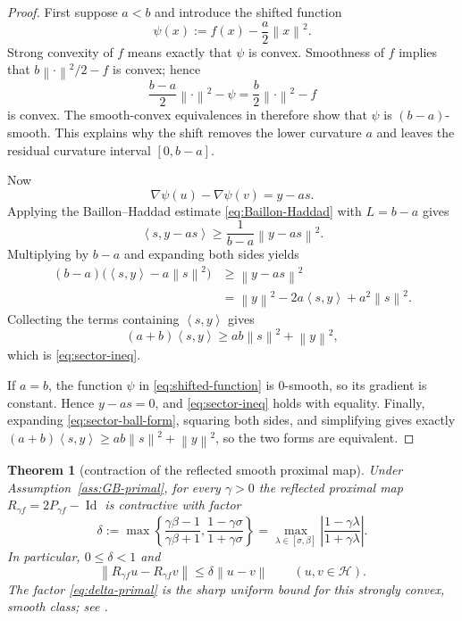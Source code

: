 \documentclass[10pt,leqno]{amsart}
\numberwithin{equation}{section}
\numberwithin{algorithm}{section}
\newtheorem{theorem}{Theorem}[section]
\theoremstyle{remark}
\newcommand{\Hcal}{\mathcal{H}}
\newcommand{\Id}{\operatorname{Id}}
\newcommand{\norm}[1]{\left\lVert #1 \right\rVert}
\newcommand{\ip}[2]{\left\langle #1,#2 \right\rangle}
\newcommand{\grad}{\nabla}
\begin{document}
\begin{proof}
First suppose $a<b$ and introduce the shifted function
\begin{equation}
\label{eq:shifted-function}
  \psi(x):=f(x)-\frac{a}{2}\norm{x}^2.
\end{equation}
Strong convexity of $f$ means exactly that $\psi$ is convex.  Smoothness of $f$ implies that $b\norm{\cdot}^2/2-f$ is convex; hence
\[
  \frac{b-a}{2}\norm{\cdot}^2-\psi
  =\frac{b}{2}\norm{\cdot}^2-f
\]
is convex.  The smooth-convex equivalences in
\cite[Thm.~18.15]{BauschkeCombettes2017} therefore show that
$\psi$ is $(b-a)$-smooth.  This explains why the shift removes the lower curvature $a$ and leaves the residual curvature interval $[0,b-a]$.

Now
\[
  \grad\psi(u)-\grad\psi(v)=y-a s.
\]
Applying the Baillon--Haddad estimate \eqref{eq:Baillon-Haddad} with
$L=b-a$ gives
\begin{equation}
\label{eq:BH-shifted}
  \ip{s}{y-a s}
  \ge\frac{1}{b-a}\norm{y-a s}^2.
\end{equation}
Multiplying by $b-a$ and expanding both sides yields
\begin{align*}
  (b-a)\bigl(\ip{s}{y}-a\norm{s}^2\bigr)
  &\ge\norm{y-a s}^2\\
  &=\norm y^2-2a\ip{s}{y}+a^2\norm s^2.
\end{align*}
Collecting the terms containing $\ip{s}{y}$ gives
\[
  (a+b)\ip{s}{y}
  \ge ab\norm s^2+\norm y^2,
\]
which is \eqref{eq:sector-ineq}.

If $a=b$, the function $\psi$ in \eqref{eq:shifted-function} is $0$-smooth, so its gradient is constant.  Hence
$y-a s=0$, and \eqref{eq:sector-ineq} holds with equality.
Finally, expanding \eqref{eq:sector-ball-form}, squaring both sides, and simplifying gives exactly
$(a+b)\ip{s}{y}\ge ab\norm s^2+\norm y^2$, so the two forms are equivalent.
\end{proof}

\begin{theorem}[contraction of the reflected smooth proximal map]
\label{thm:reflected-prox-contraction}
Under Assumption~\ref{ass:GB-primal}, for every $\gamma>0$ the reflected proximal map
$R_{\gamma f}=2P_{\gamma f}-\Id$ is contractive with factor
\begin{equation}
\label{eq:delta-primal}
  \delta
  :=\max\left\{
  \frac{\gamma\beta-1}{\gamma\beta+1},
  \frac{1-\gamma\sigma}{1+\gamma\sigma}
  \right\}
  =\max_{\lambda\in[\sigma,\beta]}
  \left|\frac{1-\gamma\lambda}{1+\gamma\lambda}\right|.
\end{equation}
In particular, $0\le\delta<1$ and
\begin{equation}
\label{eq:Rf-contractive}
  \norm{R_{\gamma f}u-R_{\gamma f}v}
  \le\delta\norm{u-v}
  \qquad(u,v\in\Hcal).
\end{equation}
The factor \eqref{eq:delta-primal} is the sharp uniform bound for this strongly convex, smooth class; see \cite{GiselssonBoyd2017}.
\end{theorem}
\end{document}
